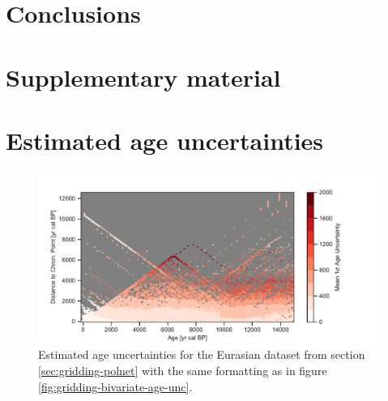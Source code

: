 \begin{refsection}
\section{Conclusions}  \label{sec:gridding-conclusions}

\clearpage

\begin{subappendices}
	\section*{Supplementary material}
	
	\section{Estimated age uncertainties}  \label{sec:gridding-suppl-age-uncertainties}	
		\begin{figure}[!h]
			\includegraphics[width=\linewidth]{gridding-figures/realized-age-uncertainties.pdf}
			\caption[Estimated age uncertainties]{Estimated age uncertainties for the Eurasian dataset from section \ref{sec:gridding-polnet} with the same formatting as in figure \ref{fig:gridding-bivariate-age-unc}.}
			\label{fig:gridding-age-uncertainties}
		\end{figure}
	
	\clearpage


\end{subappendices}
\end{refsection}
